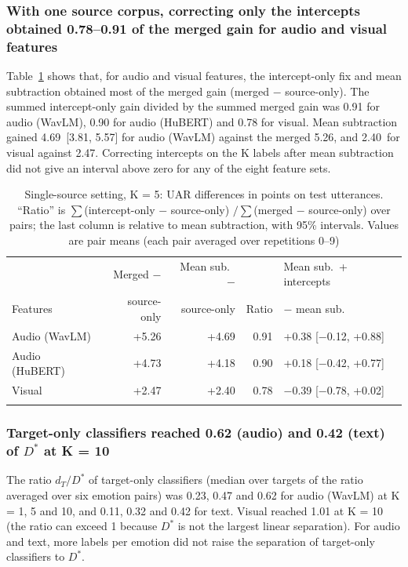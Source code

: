\subsubsection{With one source corpus, correcting only the intercepts obtained 0.78--0.91 of the merged gain for audio and visual features}
Table~\ref{tab:bias} shows that, for audio and visual features, the intercept-only fix and mean subtraction obtained most of the merged gain (merged $-$ source-only). The summed intercept-only gain divided by the summed merged gain was 0.91 for audio (WavLM), 0.90 for audio (HuBERT) and 0.78 for visual. Mean subtraction gained 4.69\pt\ [3.81, 5.57] for audio (WavLM) against the merged 5.26\pt, and 2.40\pt\ for visual against 2.47\pt. Correcting intercepts on the K labels after mean subtraction did not give an interval above zero for any of the eight feature sets.

\begin{table}[t]
\caption{Single-source setting, K = 5: UAR differences in points on test utterances. ``Ratio'' is $\sum$(intercept-only $-$ source-only) $/ \sum$(merged $-$ source-only) over pairs; the last column is relative to mean subtraction, with 95\% intervals. Values are pair means (each pair averaged over repetitions 0--9)}\label{tab:bias}
\footnotesize\setlength{\tabcolsep}{4pt}
\begin{tabular}{@{}lrrrl@{}}
\toprule
 & Merged $-$ & Mean sub.\ $-$ & & Mean sub.\ + intercepts \\
Features & source-only & source-only & Ratio & $-$ mean sub. \\
\midrule
Audio (WavLM) & +5.26 & +4.69 & 0.91 & +0.38 [$-$0.12, +0.88] \\
Audio (HuBERT) & +4.73 & +4.18 & 0.90 & +0.18 [$-$0.42, +0.77] \\
Visual & +2.47 & +2.40 & 0.78 & $-$0.39 [$-$0.78, +0.02] \\
\botrule
\end{tabular}
\end{table}

\subsubsection{Target-only classifiers reached 0.62 (audio) and 0.42 (text) of $D^{*}$ at K = 10}
The ratio $d_T/D^{*}$ of target-only classifiers (median over targets of the ratio averaged over six emotion pairs) was 0.23, 0.47 and 0.62 for audio (WavLM) at K = 1, 5 and 10, and 0.11, 0.32 and 0.42 for text. Visual reached 1.01 at K = 10 (the ratio can exceed 1 because $D^{*}$ is not the largest linear separation). For audio and text, more labels per emotion did not raise the separation of target-only classifiers to $D^{*}$.

